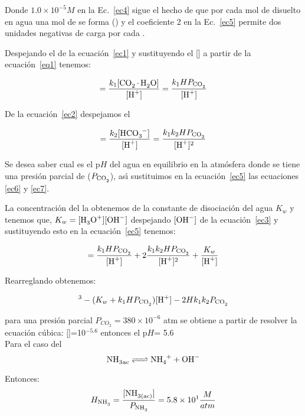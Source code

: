 Donde $1.0\times10^{-5}M$ en la Ec.~\ref{ec4} sigue el hecho de que por cada mol de  disuelto en agua una mol  de  se forma  () y el coeficiente 2 en la Ec.~\ref{ec5}  permite dos unidades negativas de carga por cada .


Despejando el  de la ecuaci\'on~\ref{ec1}  y sustituyendo el [] a partir de la ecuaci\'on~\ref{eq1} tenemos:

\begin{equation}
[\ce{HCO3-}]=\frac{k_1[\ce{CO2.H2O}]}{[\ce{H+}]}  = \frac{k_1H P_{\ce{CO2}}}{[\ce{H+}]}
\label{ec6}
\end{equation}

De la ecuaci\'on~\ref{ec2} despejamos el  

\begin{equation}
[\ce{CO3^{-2}}]= \frac{k_2[\ce{HCO3-}]}{[\ce{H+}]}= \frac{k_1k_2HP_{\ce{CO2}}}{[\ce{H+}]^2}
\label{ec7}
\end{equation}

Se desea saber cual es el p$H$ del agua en equilibrio en la atm\'osfera donde se tiene  una  presi\'on parcial de  ($P_{\ce{CO2}}$), as\'{\i} sustituimos en la ecuaci\'on~\ref{ec5} las ecuaciones \ref{ec6} y \ref{ec7}.

La concentraci\'on del  la obtenemos de la constante de disociaci\'on del agua $K_w$ y tenemos que,
$K_w = [\ce{H3O+}][\ce{OH-}]$ despejando $[\ce{OH-}]$ de la ecuaci\'on~\ref{ec3} y sustituyendo esto en la ecuaci\'on~\ref{ec5} tenemos:

\begin{equation}
[\ce{H+}]=\frac{k_1H P_{\ce{CO2}}}{[\ce{H+}]} + 2 \frac{k_1k_2HP_{\ce{CO2}}} {[\ce{H+}]^2}+\frac{K_w}{[\ce{H+}]}
\end{equation}

Rearreglando obtenemos:

\begin{equation}
[\ce{H+}]^3 - (K_w +k_1HP_{\ce{CO2}})[\ce{H+}] - 2Hk_1k_2P_{\ce{CO2}}
\end{equation}

para una presi\'on parcial $P_{CO_2} = 380\times10^{-6}$ atm se obtiene a partir de resolver la ecuaci\'on c\'ubica: []=10$^{-5.6}$ entonces el p$H$= 5.6
\\

Para el caso del 
$$\ce{NH3_{ac} <=> NH4^+ + OH^-}$$

Entonces:
\begin{equation*}
H_{\ce{NH3}} =\frac{ [\ce{NH_{3(ac)}}]} { P_{\ce{NH3}}} = 5.8\times10^1\frac{M}{atm}
\end{equation*}

